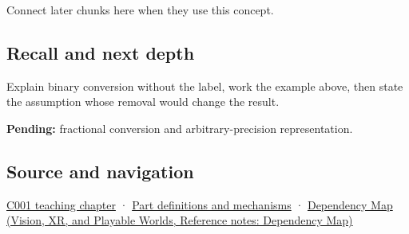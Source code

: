 \hypertarget{appendix-dc552784a2c0-used-by}{}

Connect later chunks here when they use this concept.

\subsection{Recall and next depth}\label{appendix-dc552784a2c0-recall-and-next-depth}

\hypertarget{appendix-dc552784a2c0-recall-and-next-depth}{}

Explain binary conversion without the label, work the example above, then state the assumption whose removal would change the result.

\textbf{Pending:} fractional conversion and arbitrary-precision representation.

\subsection{Source and navigation}\label{appendix-dc552784a2c0-source-and-navigation}

\hypertarget{appendix-dc552784a2c0-source-and-navigation}{}

\hyperref[01-foundations-i-ch001-from-a-signal-to-an-interpretation]{C001 teaching chapter} · \hyperref[appendix-fd090d982a15]{Part definitions and mechanisms} · \href{../07-Vision-XR-and-Playable-Worlds/main.pdf\#nameddest=appendix-4ad47bdd269a}{Dependency Map (Vision, XR, and Playable Worlds, Reference notes: Dependency Map)}
